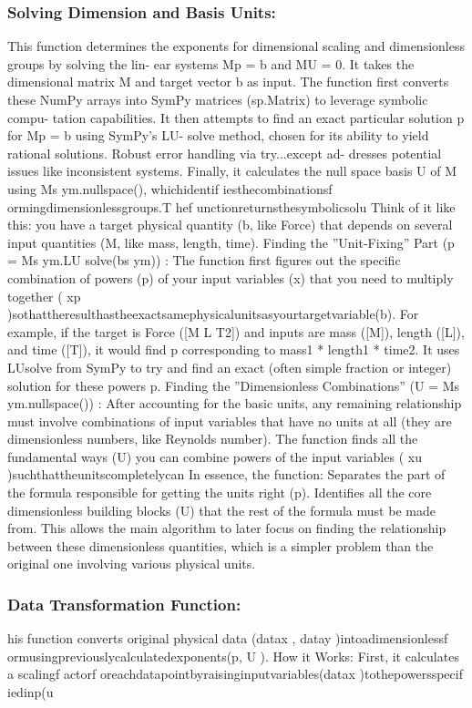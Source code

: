 \documentclass{article}
\begin{document}
\subsubsection{Solving Dimension and Basis Units:}

This function determines the exponents for dimensional scaling and dimensionless groups by solving the lin-
ear systems Mp = b and MU = 0. It takes the dimensional matrix M and target vector b as input. The
function first converts these NumPy arrays into SymPy matrices (sp.Matrix) to leverage symbolic compu-
tation capabilities. It then attempts to find an exact particular solution p for Mp = b using SymPy’s LU-
solve method, chosen for its ability to yield rational solutions. Robust error handling via try...except ad-
dresses potential issues like inconsistent systems. Finally, it calculates the null space basis U of M using
Ms ym.nullspace(), whichidentif iesthecombinationsf ormingdimensionlessgroups.T hef unctionreturnsthesymbolicsolu
Think of it like this: you have a target physical quantity (b, like Force) that depends on several input quantities
(M, like mass, length, time).
Finding the ”Unit-Fixing” Part (p = Ms ym.LU solve(bs ym)) :
The function first figures out the specific combination of powers (p) of your input variables (x) that you need to
multiply together ( xp )sothattheresulthastheexactsamephysicalunitsasyourtargetvariable(b).
For example, if the target is Force ([M L T2]) and inputs are mass ([M]), length ([L]), and time ([T]), it would
find p corresponding to mass1 * length1 * time2.
It uses LUsolve from SymPy to try and find an exact (often simple fraction or integer) solution for these powers
p.
Finding the ”Dimensionless Combinations” (U = Ms ym.nullspace()) :
After accounting for the basic units, any remaining relationship must involve combinations of input variables
that have no units at all (they are dimensionless numbers, like Reynolds number).
The function finds all the fundamental ways (U) you can combine powers of the input variables ( xu )suchthattheunitscompletelycan
In essence, the function:
Separates the part of the formula responsible for getting the units right (p).
Identifies all the core dimensionless building blocks (U) that the rest of the formula must be made from.
This allows the main algorithm to later focus on finding the relationship between these dimensionless quantities,
which is a simpler problem than the original one involving various physical units. 



\subsubsection{Data Transformation Function:}
his function converts original physical data (datax , datay )intoadimensionlessf ormusingpreviouslycalculatedexponents(p, U ).
How it Works: First, it calculates a scalingf actorf oreachdatapointbyraisinginputvariables(datax )tothepowersspecif iedinp(u\\
\end{document}

